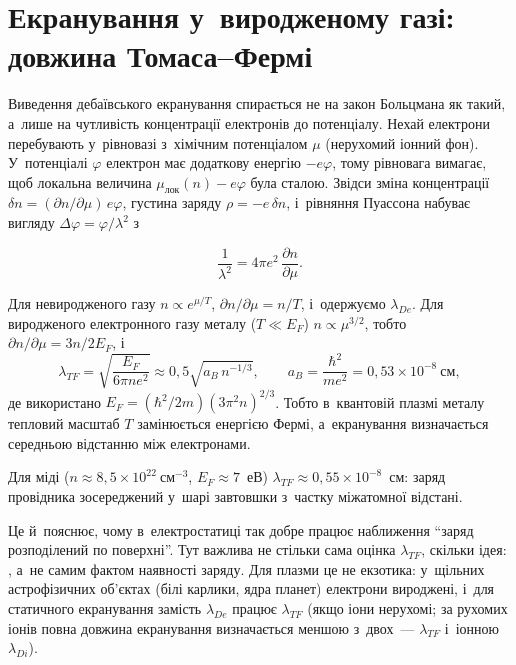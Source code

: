 \section{Екранування у~виродженому газі: довжина Томаса--Фермі}\label{sec:thomas-fermi}


Виведення дебаївського екранування спирається не на закон Больцмана як такий, а~лише на
чутливість концентрації електронів до потенціалу. Нехай електрони перебувають у~рівновазі
з~хімічним потенціалом $\mu$ (нерухомий іонний фон). У~потенціалі $\varphi$ електрон має
додаткову енергію $-e\varphi$, тому рівновага вимагає, щоб локальна величина
$\mu_{\mathrm{лок}}(n)-e\varphi$ була сталою. Звідси зміна концентрації $\delta
n=(\partial n/\partial\mu)\,e\varphi$, густина заряду $\rho=-e\,\delta n$, і~рівняння
Пуассона набуває вигляду $\Delta\varphi=\varphi/\lambda^2$ з

\begin{equation}\label{eq:screening-general}
	\frac1{\lambda^2}=4\pi e^2\,\frac{\partial n}{\partial\mu}.
\end{equation}

Для невиродженого газу $n\propto e^{\mu/T}$, $\partial
n/\partial\mu=n/T$, і~одержуємо $\lambda_{De}$. Для виродженого електронного
газу металу ($T\ll E_F$) $n\propto\mu^{3/2}$, тобто $\partial
n/\partial\mu=3n/2E_F$, і
\begin{equation}\label{eq:thomas-fermi}
	\lambda_{TF}=\sqrt{\frac{E_F}{6\pi ne^2}}\approx0{,}5\sqrt{a_B\,n^{-1/3}},\qquad a_B=\frac{\hbar^2}{me^2}=0{,}53\times10^{-8}~\text{см},
\end{equation}
де використано $E_F=(\hbar^2/2m)(3\pi^2n)^{2/3}$. Тобто в~квантовій плазмі металу тепловий
масштаб $T$ замінюється енергією Фермі, а~екранування визначається середньою
відстанню між електронами.
\begin{Estimate}
Для міді ($n\approx8{,}5\times10^{22}~\mathrm{см}^{-3}$,
$E_F\approx7$~еВ) $\lambda_{TF}\approx0{,}55\times10^{-8}$~см: заряд провідника
зосереджений у~шарі завтовшки з~частку міжатомної відстані.
\end{Estimate}
Це й~пояснює, чому
в~електростатиці так добре працює наближення \enquote{заряд розподілений по поверхні}. Тут важлива не стільки сама
оцінка $\lambda_{TF}$, скільки ідея: , а~не
самим фактом наявності заряду. Для плазми це не екзотика: у~щільних астрофізичних об'єктах (білі карлики, ядра планет) електрони вироджені, і~для статичного екранування замість $\lambda_{De}$ працює $\lambda_{TF}$ (якщо іони нерухомі; за рухомих іонів повна довжина екранування визначається меншою з~двох~--- $\lambda_{TF}$ і~іонною $\lambda_{Di}$).

